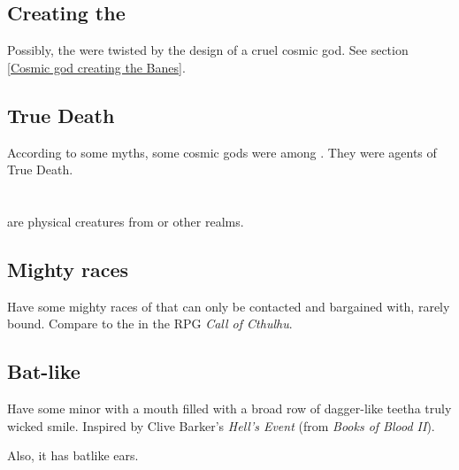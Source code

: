 \subsection{Creating the \banes}
Possibly, the \banes{} were twisted by the design of a cruel cosmic god. See section \ref{Cosmic god creating the Banes}.









\subsection{True Death}
According to some myths, some cosmic gods were among . 
They were agents of True Death. 


















\section{\Daemons}
\index{\daemon}
\Pdaemons{} are physical creatures from \Machai{} or other \chaotic{} realms. 





\subsection{Mighty \daemonic{} races}
Have some mighty races of \daemons{} that can only be contacted and bargained with, rarely bound. Compare to the  in the RPG \emph{Call of Cthulhu}. 





\subsection{Bat-like \daemon}
Have some minor \pdaemons{} with a mouth filled with a broad row of dagger-like teeth\dash a truly wicked smile. Inspired by Clive Barker's \emph{Hell's Event} (from \emph{Books of Blood II}). 

Also, it has batlike ears. 















